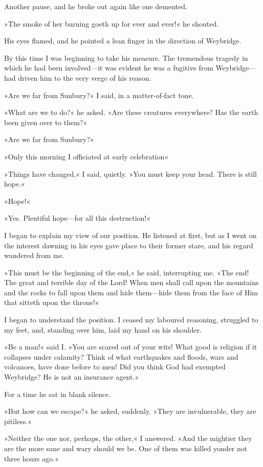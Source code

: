 Another pause, and he broke out again like one demented.

»The smoke of her burning goeth up for ever and ever!« he shouted.

His eyes flamed, and he pointed a lean finger in the direction of Weybridge.

By this time I was beginning to take his measure. The tremendous tragedy in which he had been involved—it was evident he was a fugitive from Weybridge—had driven him to the very verge of his reason.

»Are we far from Sunbury?« I said, in a matter-of-fact tone.

»What are we to do?« he asked. »Are these creatures everywhere? Has the earth been given over to them?«

»Are we far from Sunbury?«

»Only this morning I officiated at early celebration\longdash«

»Things have changed,« I said, quietly. »You must keep your head. There is still hope.«

»Hope!«

»Yes. Plentiful hope—for all this destruction!«

I began to explain my view of our position. He listened at first, but as I went on the interest dawning in his eyes gave place to their former stare, and his regard wandered from me.

»This must be the beginning of the end,« he said, interrupting me. »The end! The great and terrible day of the Lord! When men shall call upon the mountains and the rocks to fall upon them and hide them—hide them from the face of Him that sitteth upon the throne!«

I began to understand the position. I ceased my laboured reasoning, struggled to my feet, and, standing over him, laid my hand on his shoulder.

»Be a man!« said I. »You are scared out of your wits! What good is religion if it collapses under calamity? Think of what earthquakes and floods, wars and volcanoes, have done before to men! Did you think God had exempted Weybridge? He is not an insurance agent.«

For a time he sat in blank silence.

»But how can we escape?« he asked, suddenly. »They are invulnerable, they are pitiless.«

»Neither the one nor, perhaps, the other,« I answered. »And the mightier they are the more sane and wary should we be. One of them was killed yonder not three hours ago.«

